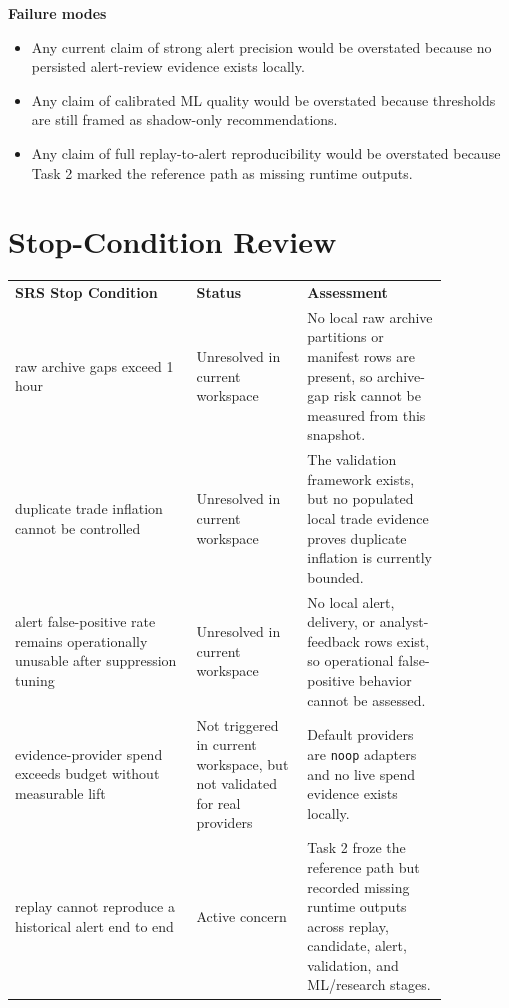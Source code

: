 \documentclass{article}
\begin{document}
\textbf{Failure modes}
\begin{itemize}
\item Any current claim of strong alert precision would be overstated because no persisted alert-review evidence exists locally.
\item Any claim of calibrated ML quality would be overstated because thresholds are still framed as shadow-only recommendations.
\item Any claim of full replay-to-alert reproducibility would be overstated because Task 2 marked the reference path as missing runtime outputs.
\end{itemize}

\section*{Stop-Condition Review}
\begin{longtable}{p{0.36\linewidth}p{0.22\linewidth}p{0.28\linewidth}}
\textbf{SRS Stop Condition} & \textbf{Status} & \textbf{Assessment} \\
raw archive gaps exceed 1 hour & Unresolved in current workspace & No local raw archive partitions or manifest rows are present, so archive-gap risk cannot be measured from this snapshot. \\
duplicate trade inflation cannot be controlled & Unresolved in current workspace & The validation framework exists, but no populated local trade evidence proves duplicate inflation is currently bounded. \\
alert false-positive rate remains operationally unusable after suppression tuning & Unresolved in current workspace & No local alert, delivery, or analyst-feedback rows exist, so operational false-positive behavior cannot be assessed. \\
evidence-provider spend exceeds budget without measurable lift & Not triggered in current workspace, but not validated for real providers & Default providers are \texttt{noop} adapters and no live spend evidence exists locally. \\
replay cannot reproduce a historical alert end to end & Active concern & Task 2 froze the reference path but recorded missing runtime outputs across replay, candidate, alert, validation, and ML/research stages. \\
\end{longtable}
\end{document}
